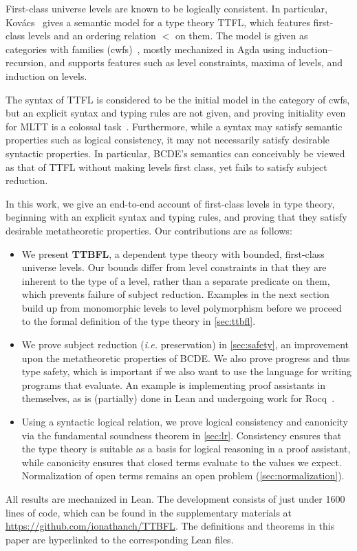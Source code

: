 \documentclass[a4paper,UKenglish,cleveref,autoref,thm-restate]{lipics-v2021}
\makeatletter
\newcommand{\citep}[1]{\cite{#1}}
\newcommand{\repo}{https://github.com/ionathanch/TTBFL}
\newcommand{\lang}{TTBFL\@\xspace}
\newcommand{\ie}{\textit{i.e.}\@\xspace}
\makeatother
\begin{document}
First-class universe levels are known to be logically consistent.
In particular, Kov\'{a}cs~\citep{gen-univ} gives a semantic model for a type theory TTFL,
which features first-class levels and an ordering relation $<$ on them.
The model is given as categories with families (cwfs)~\citep{cwf},
mostly mechanized in Agda using induction--recursion,
and supports features such as level constraints,
maxima of levels, and induction on levels.

The syntax of TTFL is considered to be the initial model in the category of cwfs,
but an explicit syntax and typing rules are not given,
and proving initiality even for MLTT is a colossal task~\citep{initiality}.
Furthermore, while a syntax may satisfy semantic properties such as logical consistency,
it may not necessarily satisfy desirable syntactic properties.
In particular, BCDE's semantics can conceivably be viewed as
that of TTFL without making levels first class,
yet fails to satisfy subject reduction.

In this work, we give an end-to-end account of first-class levels in type theory,
beginning with an explicit syntax and typing rules,
and proving that they satisfy desirable metatheoretic properties.
Our contributions are as follows:

\begin{itemize}[topsep=0pt]
  \item We present \textbf{\lang},
    a dependent type theory with bounded, first-class universe levels.
    Our bounds differ from level constraints in that
    they are inherent to the type of a level,
    rather than a separate predicate on them,
    which prevents failure of subject reduction.
    Examples in the next section build up from monomorphic levels to level polymorphism
    before we proceed to the formal definition of the type theory in \cref{sec:ttbfl}.
  \item We prove subject reduction (\ie preservation) in \cref{sec:safety},
    an improvement upon the metatheoretic properties of BCDE.
    We also prove progress and thus type safety,
    which is important if we also want to use the language for writing programs that evaluate.
    An example is implementing proof assistants in themselves,
    as is (partially) done in Lean and undergoing work for Rocq~\citep{coq-in-coq}.
  \item Using a syntactic logical relation,
    we prove logical consistency and canonicity
    via the fundamental soundness theorem in \cref{sec:lr}.
    Consistency ensures that the type theory is suitable
    as a basis for logical reasoning in a proof assistant,
    while canonicity ensures that closed terms evaluate to the values we expect.
    Normalization of open terms remains an open problem (\cref{sec:normalization}).
\end{itemize}
%
All results are mechanized in Lean.
The development consists of just under 1600 lines of code,
which can be found in the supplementary materials at \url{\repo}.
The definitions and theorems in this paper
are hyperlinked to the corresponding Lean files.
\end{document}
